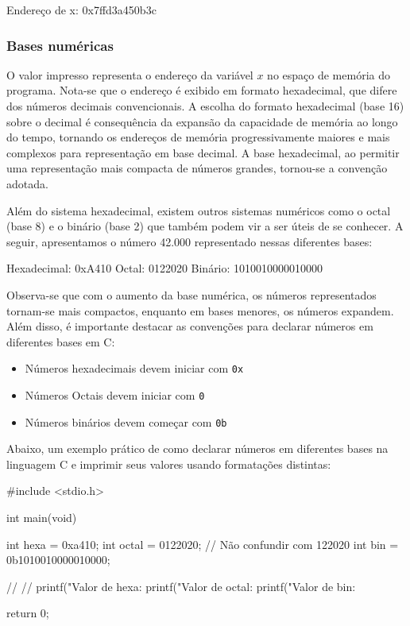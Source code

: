 \begin{textbox}
    Endereço de x: 0x7ffd3a450b3c
\end{textbox}

\subsubsection{Bases numéricas}

O valor impresso representa o endereço da variável \(x\) no espaço de memória 
do programa. Nota-se que o endereço é exibido em formato hexadecimal, que 
difere dos números decimais convencionais. A escolha do formato hexadecimal 
(base 16) sobre o decimal é consequência da expansão da capacidade de memória 
ao longo do tempo, tornando os endereços de memória progressivamente maiores e 
mais complexos para representação em base decimal. A base hexadecimal, ao 
permitir uma representação mais compacta de números grandes, tornou-se a 
convenção adotada.

Além do sistema hexadecimal, existem outros sistemas numéricos como o octal 
(base 8) e o binário (base 2) que também podem vir a ser úteis de se conhecer. 
A seguir, apresentamos o número 42.000 representado nessas diferentes bases:

\begin{textbox}
    Hexadecimal: 0xA410
    Octal: 0122020
    Binário: 1010010000010000
\end{textbox}

Observa-se que com o aumento da base numérica, os números representados 
tornam-se mais compactos, enquanto em bases menores, os números expandem. Além 
disso, é importante destacar as convenções para declarar números em diferentes 
bases em C:

\begin{itemize}
        \renewcommand{\labelitemi}{\tiny$\blacksquare$}
    \item Números hexadecimais devem iniciar com \texttt{0x}
    \item Números Octais devem iniciar com \texttt{0}
    \item Números binários devem começar com \texttt{0b}
\end{itemize}

Abaixo, um exemplo prático de como declarar números em diferentes bases na 
linguagem C e imprimir seus valores usando formatações distintas:

\begin{excode}
    #include <stdio.h>

    int main(void)
    {
        int hexa = 0xa410;
        int octal = 0122020; // Não confundir com 122020
        int bin = 0b1010010000010000;

        // %
        // %
        printf("Valor de hexa: %
        printf("Valor de octal: %
        printf("Valor de bin: %

        return 0;
    }
\end{excode}

